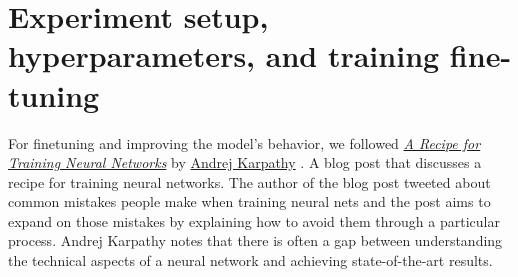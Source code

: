 \section{Experiment setup, hyperparameters, and training fine-tuning}



For finetuning and improving the model's behavior, we followed \href{http://karpathy.github.io/2019/04/25/recipe/}{\textit{A Recipe for Training Neural Networks}} \cite{AndrejKarpathyHttp://karpathy.github.io/2019/04/25/recipe/} by \href{https://karpathy.ai/}{Andrej Karpathy} \cite{AndrejKarpathyHttps://karpathy.ai/}. A blog post that discusses a recipe for training neural networks. The author of the blog post tweeted about common mistakes people make when training neural nets and the post aims to expand on those mistakes by explaining how to avoid them through a particular process. Andrej Karpathy notes that there is often a gap between understanding the technical aspects of a neural network and achieving state-of-the-art results.

